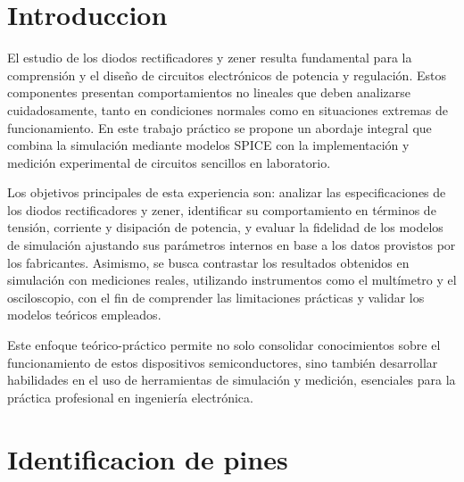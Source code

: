 \documentclass[chaptersright]{informeutn}
\begin{document}
\maketitle
\tableofcontents

\chapter{Introduccion}

  El estudio de los diodos rectificadores y zener resulta fundamental para la comprensión y el diseño de circuitos
  electrónicos de potencia y regulación. Estos componentes presentan comportamientos no lineales que deben analizarse
  cuidadosamente, tanto en condiciones normales como en situaciones extremas de funcionamiento. En este trabajo práctico
  se propone un abordaje integral que combina la simulación mediante modelos SPICE con la implementación y medición
  experimental de circuitos sencillos en laboratorio.
    
  Los objetivos principales de esta experiencia son: analizar las especificaciones de los diodos rectificadores y zener,
  identificar su comportamiento en términos de tensión, corriente y disipación de potencia, y evaluar la fidelidad de
  los modelos de simulación ajustando sus parámetros internos en base a los datos provistos por los fabricantes.
  Asimismo, se busca contrastar los resultados obtenidos en simulación con mediciones reales, utilizando instrumentos
  como el multímetro y el osciloscopio, con el fin de comprender las limitaciones prácticas y validar los modelos
  teóricos empleados.

  Este enfoque teórico-práctico permite no solo consolidar conocimientos sobre el funcionamiento de estos dispositivos
  semiconductores, sino también desarrollar habilidades en el uso de herramientas de simulación y medición, esenciales
  para la práctica profesional en ingeniería electrónica.
  
\chapter{Identificacion de pines}
\end{document}
